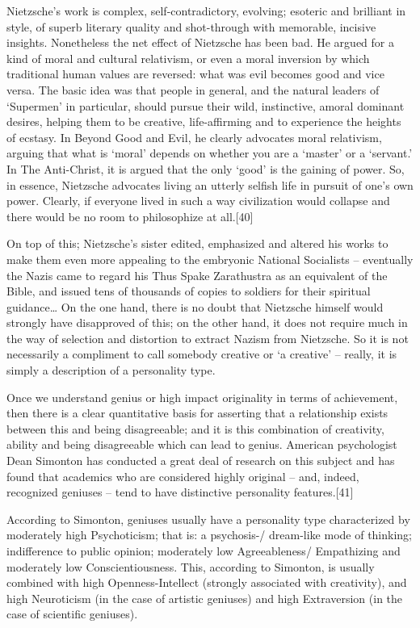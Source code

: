 \documentclass[
]{book}
\begin{document}
Nietzsche's work is complex, self-contradictory, evolving; esoteric and brilliant in style, of superb literary quality and shot-through with memorable, incisive insights. Nonetheless the net effect of Nietzsche has been bad. He argued for a kind of moral and cultural relativism, or even a moral inversion by which traditional human values are reversed: what was evil becomes good and vice versa. The basic idea was that people in general, and the natural leaders of `Supermen' in particular, should pursue their wild, instinctive, amoral dominant desires, helping them to be creative, life-affirming and to experience the heights of ecstasy. In Beyond Good and Evil, he clearly advocates moral relativism, arguing that what is `moral' depends on whether you are a `master' or a `servant.' In The Anti-Christ, it is argued that the only `good' is the gaining of power. So, in essence, Nietzsche advocates living an utterly selfish life in pursuit of one's own power. Clearly, if everyone lived in such a way civilization would collapse and there would be no room to philosophize at all.{[}40{]}

On top of this; Nietzsche's sister edited, emphasized and altered his works to make them even more appealing to the embryonic National Socialists -- eventually the Nazis came to regard his Thus Spake Zarathustra as an equivalent of the Bible, and issued tens of thousands of copies to soldiers for their spiritual guidance\ldots{} On the one hand, there is no doubt that Nietzsche himself would strongly have disapproved of this; on the other hand, it does not require much in the way of selection and distortion to extract Nazism from Nietzsche.
So it is not necessarily a compliment to call somebody creative or `a creative' -- really, it is simply a description of a personality type.

Once we understand genius or high impact originality in terms of achievement, then there is a clear quantitative basis for asserting that a relationship exists between this and being disagreeable; and it is this combination of creativity, ability and being disagreeable which can lead to genius. American psychologist Dean Simonton has conducted a great deal of research on this subject and has found that academics who are considered highly original -- and, indeed, recognized geniuses -- tend to have distinctive personality features.{[}41{]}

According to Simonton, geniuses usually have a personality type characterized by moderately high Psychoticism; that is: a psychosis-/ dream-like mode of thinking; indifference to public opinion; moderately low Agreeableness/ Empathizing and moderately low Conscientiousness. This, according to Simonton, is usually combined with high Openness-Intellect (strongly associated with creativity), and high Neuroticism (in the case of artistic geniuses) and high Extraversion (in the case of scientific geniuses).
\end{document}
